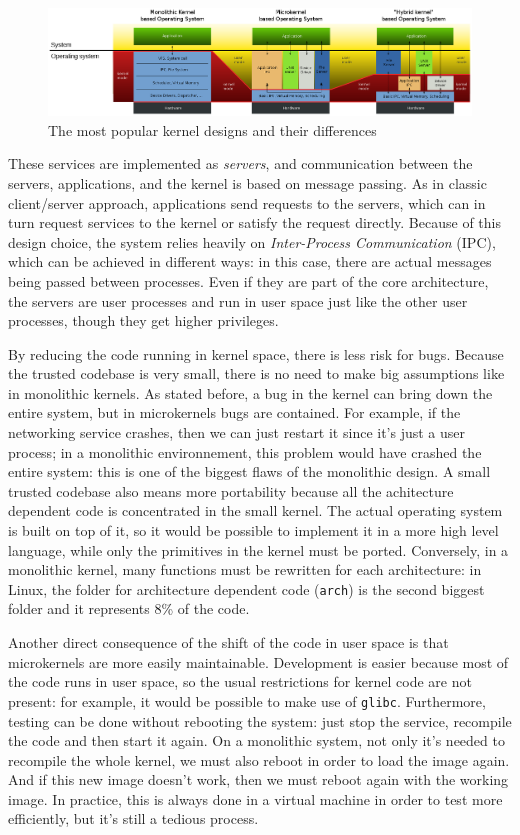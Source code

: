 \begin{figure}[ht]
\includegraphics[width=\textwidth, keepaspectratio]{images/monolithic.png}
\caption{The most popular kernel designs and their differences}
\label{img:monolithic}
\end{figure}

These services are implemented as \textit{servers}, and communication between the servers, applications, and the kernel is based on message passing. As in classic client/server approach, applications send requests to the servers, which can in turn request services to the kernel or satisfy the request directly. Because of this design choice, the system relies heavily on \textit{Inter-Process Communication} (IPC), which can be achieved in different ways: in this case, there are actual messages being passed between processes. Even if they are part of the core architecture, the servers are user processes and run in user space just like the other user processes, though they get higher privileges.

By reducing the code running in kernel space, there is less risk for bugs. Because the trusted codebase is very small, there is no need to make big assumptions like in monolithic kernels. As stated before, a bug in the kernel can bring down the entire system, but in microkernels bugs are contained. For example, if the networking service crashes, then we can just restart it since it's just a user process; in a monolithic environnement, this problem would have crashed the entire system: this is one of the biggest flaws of the monolithic design. A small trusted codebase also means more portability because all the achitecture dependent code is concentrated in the small kernel. The actual operating system is built on top of it, so it would be possible to implement it in a more high level language, while only the primitives in the kernel must be ported. Conversely, in a monolithic kernel, many functions must be rewritten for each architecture: in Linux, the folder for architecture dependent code (\verb|arch|) is the second biggest folder and it represents 8\% of the code.

Another direct consequence of the shift of the code in user space is that microkernels are more easily maintainable. Development is easier because most of the code runs in user space, so the usual restrictions for kernel code are not present: for example, it would be possible to make use of \verb|glibc|. Furthermore, testing can be done without rebooting the system: just stop the service, recompile the code and then start it again. On a monolithic system, not only it's needed to recompile the whole kernel, we must also reboot in order to load the image again. And if this new image doesn't work, then we must reboot again with the working image. In practice, this is always done in a virtual machine in order to test more efficiently, but it's still a tedious process.

